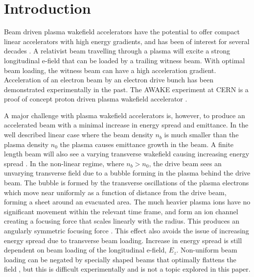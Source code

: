 \documentclass[aps,prstab,reprint,amsmath,amssymb,groupedaddress]{revtex4-1}
\begin{document}
\section[\label{S:I}]{Introduction}

Beam driven plasma wakefield accelerators have the potential to offer compact linear accelerators with high energy
gradients, and has been of interest for several decades \cite{chen:1985}. A relativist beam travelling through a plasma
will excite a strong longitudinal e-field that can be loaded by a trailing witness beam. With optimal beam loading, the
witness beam can have a high acceleration gradient. Acceleration of an electron beam by an electron drive bunch has been
demonstrated experimentally \cite{rosenzweig:1988, blumenfeld:2007, kallos:2008} in the past. The AWAKE experiment at
CERN is a proof of concept proton driven plasma wakefield accelerator \cite{awake_collaboration:2014}.

A major challenge with plasma wakefield accelerators is, however, to produce an accelerated beam with a minimal increase
in energy spread and emittance. In the well described linear case where the beam density $n_{b}$ is much smaller than
the plasma density $n_{0}$ the plasma causes emittance growth in the beam. A finite length beam will also see a varying
transverse wakefield causing increasing energy spread \cite{katsouleas:1987}. In the non-linear regime, where
$n_{b} > n_{0}$, the drive beam sees an unvarying transverse field due to a bubble forming in the plasma behind the
drive beam. The bubble is formed by the transverse oscillations of the plasma electrons which move near uniformly as a
function of distance from the drive beam, forming a sheet around an evacuated area. The much heavier plasma ions have no
significant movement within the relevant time frame, and form an ion channel creating a focusing force that scales
linearly with the radius. This produces an angularly symmetric focusing force \cite{lu:2006-1, lu:2006}. This effect
also avoids the issue of increasing energy spread due to transverse beam loading. Increase in energy spread is still
dependent on beam loading of the longitudinal e-field, $E_{z}$. Non-uniform beam loading can be negated by specially
shaped beams that optimally flattens the field \cite{katsouleas:1987, tzoufras:2009}, but this is difficult
experimentally and is not a topic explored in this paper.
\end{document}
